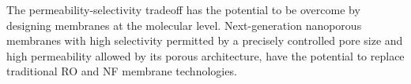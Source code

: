 \documentclass{article}
\begin{document}



  The permeability-selectivity tradeoff has the potential to be overcome by
  designing membranes at the molecular level. Next-generation nanoporous
  membranes with high selectivity permitted by a precisely controlled pore size
  and high permeability allowed by its porous architecture, have the potential to
  replace traditional RO and NF membrane technologies. 
\end{document}
